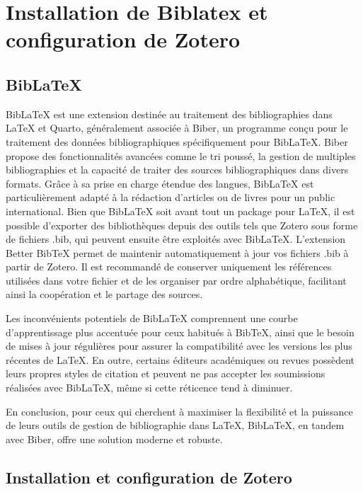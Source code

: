 \documentclass[
  letterpaper,
  DIV=11,
  numbers=noendperiod]{scrreprt}
\begin{document}

\chapter{Installation de Biblatex et configuration de
Zotero}\label{installation-de-biblatex-et-configuration-de-zotero}

\section{BibLaTeX}\label{biblatex}

BibLaTeX est une extension destinée au traitement des bibliographies
dans LaTeX et Quarto, généralement associée à Biber, un programme conçu
pour le traitement des données bibliographiques spécifiquement pour
BibLaTeX. Biber propose des fonctionnalités avancées comme le tri
poussé, la gestion de multiples bibliographies et la capacité de traiter
des sources bibliographiques dans divers formats. Grâce à sa prise en
charge étendue des langues, BibLaTeX est particulièrement adapté à la
rédaction d'articles ou de livres pour un public international. Bien que
BibLaTeX soit avant tout un package pour LaTeX, il est possible
d'exporter des bibliothèques depuis des outils tels que Zotero sous
forme de fichiers .bib, qui peuvent ensuite être exploités avec
BibLaTeX. L'extension Better BibTeX permet de maintenir automatiquement
à jour vos fichiers .bib à partir de Zotero. Il est recommandé de
conserver uniquement les références utilisées dans votre fichier et de
les organiser par ordre alphabétique, facilitant ainsi la coopération et
le partage des sources.

Les inconvénients potentiels de BibLaTeX comprennent une courbe
d'apprentissage plus accentuée pour ceux habitués à BibTeX, ainsi que le
besoin de mises à jour régulières pour assurer la compatibilité avec les
versions les plus récentes de LaTeX. En outre, certains éditeurs
académiques ou revues possèdent leurs propres styles de citation et
peuvent ne pas accepter les soumissions réalisées avec BibLaTeX, même si
cette réticence tend à diminuer.

En conclusion, pour ceux qui cherchent à maximiser la flexibilité et la
puissance de leurs outils de gestion de bibliographie dans LaTeX,
BibLaTeX, en tandem avec Biber, offre une solution moderne et robuste.

\section{Installation et configuration de
Zotero}\label{installation-et-configuration-de-zotero}
\end{document}
